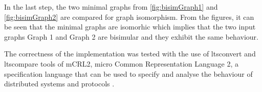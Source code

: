 In the last step, the two minimal graphs from \ref{fig:bisimGraph1} and \ref{fig:bisimGraph2} are compared for graph isomorphism.
From the figures, it can be seen that the minimal graphs are isomorhic which implies that the two input graphs Graph 1 and Graph 2 
are bisimular and they exhibit the same behaviour.

The correctness of the implementation was tested with the use of ltsconvert and ltscompare tools of mCRL2, micro Common Representation Language 2, a specification language that can be used to specify and analyse the behaviour of distributed systems and protocols
\cite{mCRL2Ref}.